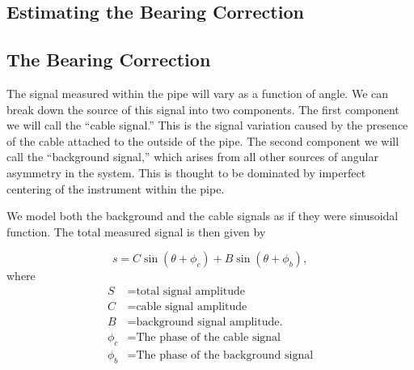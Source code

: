 \documentclass[paper=a4, fontsize=11pt]{scrartcl}
\numberwithin{equation}{section}		%
\numberwithin{figure}{section}			%
\numberwithin{table}{section}				%
\begin{document}
\begin{appendices}




\section{Estimating the Bearing Correction}
\subsection{The Bearing Correction}
The signal measured within the pipe will vary as a function of angle.  We can break down the source of this signal into two components.  The first component we will call the ``cable signal.''  This is the signal variation caused by the presence of the cable attached to the outside of the pipe.  The second component we will call the ``background signal,'' which arises from all other sources of angular asymmetry in the system.  This is thought to be dominated by imperfect centering of the instrument within the pipe.

\par We model both the background and the cable signals as if they were sinusoidal function. The total measured signal is then given by

\begin{equation} \label{eq:trig_sig}
    s = C \sin\left(\theta + \phi_c\right) + B \sin\left(\theta + \phi_b\right),
\end{equation}
where
\begin{align*}
        S &= \text{total signal amplitude} \\
        C &= \text{cable signal amplitude} \\
        B &= \text{background signal amplitude.} \\
        \phi_c &= \text{The phase of the cable signal}\\
        \phi_b &= \text{The phase of the background signal}\\
\end{align*}


\end{appendices}
\end{document}
